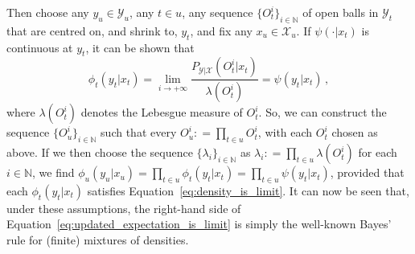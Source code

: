 \documentclass[twoside,11pt]{article}
\newcommand{\nats}{\mathbb{N}}
\newcommand{\states}{\mathcal{X}}
\newcommand{\observs}{\mathcal{Y}}
\newcommand{\coloneqq}{:\!=}
\begin{document}
Then choose any $y_u\in\observs_u$, any $t\in u$, any sequence $\{O_t^i\}_{i\in\nats}$ of open balls in $\observs_t$ that are centred on, and shrink to, $y_t$, and fix any $x_u\in\states_u$. If $\psi(\cdot\vert x_t)$ is continuous at $y_t$, it can be shown that
\begin{equation}\label{eq:density_is_limit}
\phi_t(y_t\vert x_t) = \lim_{i\to+\infty} \frac{P_{\observs\vert\states}(O_t^i\vert x_t)}{\lambda(O_t^i)} = \psi(y_t\vert x_t)\,,
\end{equation}
where $\lambda(O_t^i)$ denotes the Lebesgue measure of $O_t^i$. So, we can construct the sequence $\{O_u^i\}_{i\in\nats}$ such that every $O_u^i\coloneqq \prod_{t\in u}O_t^i$, with each $O_t^i$ chosen as above. If we then choose the sequence $\{\lambda_i\}_{i\in\nats}$ as $\lambda_i\coloneqq \prod_{t\in u}\lambda(O_t^i)$ for each $i\in\nats$, we find 
$\phi_u(y_u\vert x_u) = \prod_{t\in u}\phi_t(y_t\vert x_t)=\prod_{t\in u}\psi(y_t\vert x_t)$, 
provided that each $\phi_t(y_t\vert x_t)$ satisfies Equation~\eqref{eq:density_is_limit}. %
%
It can now be seen that, under these assumptions, the right-hand side of Equation~\eqref{eq:updated_expectation_is_limit} is simply the well-known Bayes' rule for (finite) mixtures of densities. 
\end{document}
